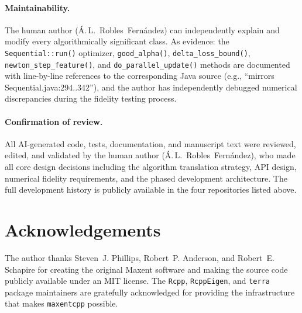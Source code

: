 \documentclass[10pt,letterpaper]{article}
\begin{document}
\paragraph{Maintainability.}
The human author (\'A.\,L.\ Robles~Fern\'andez) can independently
explain and modify every algorithmically significant class.
As evidence: the \texttt{Sequential::run()} optimizer,
\texttt{good\_alpha()}, \texttt{delta\_loss\_bound()},
\texttt{newton\_step\_feature()}, and \texttt{do\_parallel\_update()}
methods are documented with line-by-line references to the corresponding
Java source (e.g., ``mirrors Sequential.java:294..342''), and the author
has independently debugged numerical discrepancies during the fidelity
testing process.

\paragraph{Confirmation of review.}
All AI-generated code, tests, documentation, and manuscript text were
reviewed, edited, and validated by the human author
(\'A.\,L.\ Robles~Fern\'andez), who made all core design decisions
including the algorithm translation strategy, API design, numerical
fidelity requirements, and the phased development architecture.
The full development history is publicly available in the four
repositories listed above.

\section*{Acknowledgements}

The author thanks Steven~J. Phillips, Robert~P. Anderson, and
Robert~E. Schapire for creating the original Maxent software and making
the source code publicly available under an MIT license.
The \texttt{Rcpp}, \texttt{RcppEigen}, and \texttt{terra} package
maintainers are gratefully acknowledged for providing the infrastructure
that makes \texttt{maxentcpp} possible.

\nolinenumbers



\end{document}

